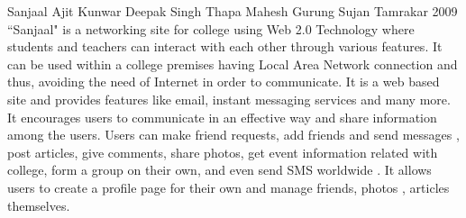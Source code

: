  \begin{conf-abstract}[]
{Sanjaal }
{
Ajit Kunwar
Deepak Singh Thapa
Mahesh Gurung
Sujan Tamrakar
}
{2009}
``Sanjaal" is a networking site for college using Web 2.0 Technology where students and teachers can interact with each other through various features. It can be used within a college premises having Local Area Network connection and thus, avoiding the need of Internet in order to communicate. It is a web based site and provides features like email, instant messaging services and many more. It encourages users to communicate in an effective way and share information among the users. Users can make friend requests, add friends and send messages , post articles, give comments, share photos, get event information related with college, form a group on their own, and even send SMS  worldwide . It allows users to create a profile page for their own and manage friends, photos , articles themselves. 
  \end{conf-abstract}